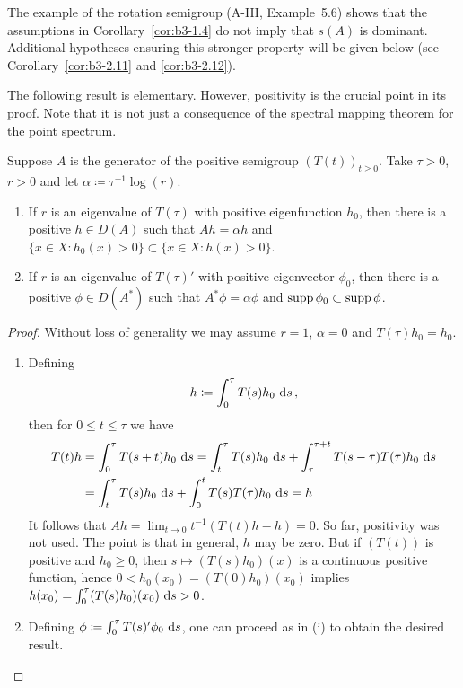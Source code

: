 The example of the rotation semigroup (A-III, Example~5.6) shows that the assumptions in Corollary~\ref{cor:b3-1.4} do not imply that $s(A)$ is dominant.
Additional hypotheses ensuring this stronger property will be given below (see Corollary~\ref{cor:b3-2.11} and \ref{cor:b3-2.12}).

The following result is elementary. 
However, positivity is the crucial point in its proof. 	
Note that it is not just a consequence of the spectral mapping theorem for the point spectrum.
\begin{proposition}\label{prop:b3-1.5}
Suppose $A$ is the generator of the positive semigroup $(T(t))_{t \geq 0}$.
Take $\tau > 0$, $r > 0$ and let $\alpha \coloneqq \tau^{-1}\log(r)$.
\begin{enumerate}[\upshape (i)]
\item 
If $r$ is an eigenvalue of $T(\tau)$ with positive eigenfunction $h_{0}$, then there is a positive $h \in D(A)$ such that $Ah = \alpha h$ and $\{x \in X \colon h_{0}(x) > 0\} \subset \{x \in X \colon h(x) > 0\}$.
		
\item 
If $r$ is an eigenvalue of $T(\tau)'$ with positive eigenvector $\phi_{0}$, then there is a positive $\phi \in D(A^*)$ such that $A^*\phi = \alpha\phi$ and $\mathop{}\!\mathrm{supp}\,\phi_{0} \subset \mathop{}\!\mathrm{supp}\,\phi$.
	\end{enumerate}
\end{proposition}
\begin{proof}
	Without loss of generality we may assume $r = 1$, \ie $\alpha = 0$ and $T(\tau)h_{0} = h_{0}$.
	\begin{enumerate}[\upshape (i), wide, labelindent=.5em]
    \item 
	Defining
	\begin{equation}\label{eq:b3-1.14}
		h \coloneqq \int_{0}^{\tau} T(s)h_{0} \, \mathop{}\!\mathrm{d}{s} \,,
	\end{equation}
	then for $0 \leq t \leq \tau$ we have
	\begin{align*}
		T(t)h &= \int_{0}^{\tau} T(s+t)h_{0} \, \mathop{}\!\mathrm{d}{s}  = \int_{t}^{\tau} T(s)h_{0} \, \mathop{}\!\mathrm{d}{s}  + \int_{\tau}^{\tau+t} T(s-\tau)T(\tau)h_{0} \, \mathop{}\!\mathrm{d}{s}  \\
		&= \int_{t}^{\tau} T(s)h_{0} \, \mathop{}\!\mathrm{d}{s}  + \int_{0}^{t} T(s)T(\tau)h_{0} \, \mathop{}\!\mathrm{d}{s}  = h
	\end{align*}
	It follows that $Ah = \lim_{t \to 0} t^{-1}(T(t)h - h) = 0$.
	So far, positivity was not used. 
    The point is that in general, $h$ may be zero.
	But if $(T(t))$ is positive and $h_{0} \geq 0$, then $s \mapsto (T(s)h_{0})(x)$ is a continuous positive function, hence $0 < h_{0}(x_{0}) = (T(0)h_{0})(x_{0})$ implies $h(x_{0}) = \int_{0}^{\tau} (T(s)h_{0})(x_{0}) \, \mathop{}\!\mathrm{d}{s}  > 0$.
	
	\item 
	Defining $\phi \coloneqq \int_{0}^{\tau} T(s)'\phi_{0} \, \mathop{}\!\mathrm{d}{s} $, one can proceed as in (i) to obtain the desired result.
	\end{enumerate}
\end{proof}
